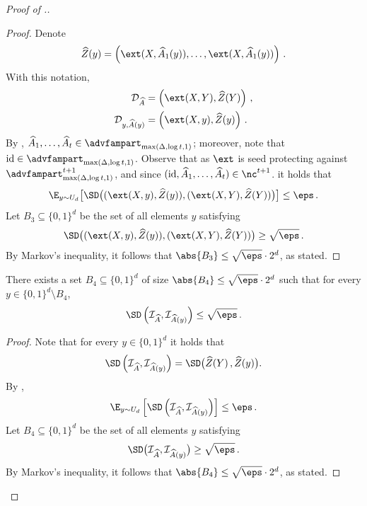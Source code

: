 \documentclass{toc}
\begin{document}
\begin{proof}[Proof of .]
\begin{proof}
	Denote 
	\begin{align*}
		\widehat{Z}(y) = \left(\ext(X,\widehat{A}_1(y)), \ldots, \ext(X,\widehat{A}_1(y))\right)\,.
	\end{align*}
	With this notation, 
	\begin{align*}
	\mathcal{D}_{\widehat{A}} &= \left( \ext(X,Y), \widehat{Z}(Y) \right)\,, \\
	\mathcal{D}_{y,\widehat{A}(y)} &= \left( \ext(X,y), \widehat{Z}(y) \right)\,.
	\end{align*}
%
	By , $\widehat{A}_1,\ldots,\widehat{A}_t \in \advfampart_{\max(\Delta, \log t,1)}$; moreover, note that  $\mathrm{id} \in \advfampart_{\max(\Delta, \log t,1)}$. Observe that as $\ext$ is seed protecting against $\advfampart_{\max(\Delta, \log t,1)}^{t+1}$, and since $(\mathrm{id},\widehat{A}_1,\ldots,\widehat{A}_t) \in \nc^{t+1}$. it holds that %
	\begin{equation}\label{eq: low z}
	\E_{y\sim U_d}\big[\SD\big((\ext(X,y), \widehat{Z}(y)), (\ext(X,Y),\widehat{Z}(Y))\big)\big] \leq \eps\,.
	\end{equation}
	Let $B_3 \subseteq \{0,1\}^d$ be the set of all elements $y$ satisfying
	\begin{align*}
	\SD\big((\ext(X,y), \widehat{Z}(y)),(\ext(X,Y), \widehat{Z}(Y))\big) \geq \sqrt{\eps}\,.
	\end{align*}
	By Markov's inequality, it follows that $\abs{B_3} \leq \sqrt{\eps}\cdot 2^d$, as stated.
%
	
\end{proof}

\begin{claim}\label{claim:i is concentrated}
	There exists a set
	 $B_4 \subseteq \{0,1\}^d$ of size $\abs{B_4} \le \sqrt{\eps} \cdot 2^d$ such that for every $y \in \{0,1\}^d \setminus B_4$,
	\[
	\SD\left(\mathcal{I}_{\widehat{A}}, \mathcal{I}_{\widehat{A}(y)}\right) \le \sqrt{\eps}\,.
	\]
\end{claim}
\begin{proof}
	Note that for every $y \in \{0,1\}^d$ it holds that  
	\[
	\SD\left(\mathcal{I}_{\widehat{A}}, \mathcal{I}_{\widehat{A}(y)}\right) = \SD\big(\widehat{Z}(Y)\,, \widehat{Z}(y)\big).
	\]
	By ,
	\[
	\E_{y\sim U_d}\left[\SD\left(\mathcal{I}_{\widehat{A}}, \mathcal{I}_{\widehat{A}(y)}\right)\right] \leq \eps\,.  
	\]
	Let $B_4 \subseteq \{0,1\}^d$ be the set of all elements $y$ satisfying
	\begin{align*}
	\SD\big(\mathcal{I}_{\widehat{A}}, \mathcal{I}_{\widehat{A}(y)}\big) \geq \sqrt{\eps}\,.
	\end{align*}
	By Markov's inequality, it follows that $\abs{B_4} \leq \sqrt{\eps}\cdot 2^d$, as stated.
\end{proof}



\end{proof}
\end{document}
